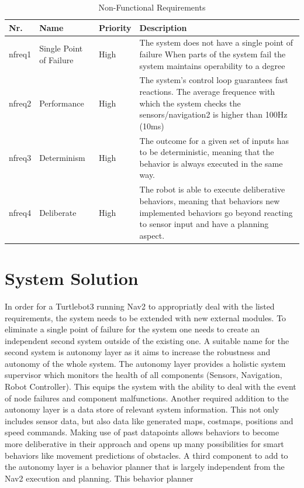 \begin{table}[h!]
\caption{Non-Functional Requirements}
	\begin{tabular}{ | m{} | m{}| m{} | m{} |} 
  	\hline
  	Nr. & Name & Priority & Description \\ 
  	\hline
  	nfreq1 & Single Point of Failure & High &  The system does not have a single point of failure	When parts of the system fail the system maintains operability to a degree \\ 
  	\hline
  	nfreq2 & Performance & High & The system's control loop guarantees fast reactions. The average frequence with which the system checks the sensors/navigation2 is higher than 100Hz (10ms) \\ 
  	\hline
  	nfreq3 & Determinism & High & The outcome for a given set of inputs has to be deterministic, meaning that the behavior is always executed in the same way. \\
  	\hline
  	nfreq4 & Deliberate & High & The robot is able to execute deliberative behaviors, meaning that behaviors new implemented behaviors go beyond reacting to sensor input and have a planning aspect. \\
	\end{tabular}
\end{table}

\section{System Solution}

In order for a Turtlebot3 running Nav2 to appropriatly deal with the listed requirements, the system needs to be extended with new external modules. To eliminate a single point of failure for the system one needs to create an independent second system outside of the existing one. A suitable name for the second system is autonomy layer as it aims to increase the robustness and autonomy of the whole system. 
The autonomy layer provides a holistic system supervisor which monitors the health of all components (Sensors, Navigation, Robot Controller). This equips the system with the ability to deal with the event of node failures and component malfunctions. 
Another required addition to the autonomy layer is a data store of relevant system information. This not only includes sensor data, but also data like generated maps, costmaps, positions and speed commands. Making use of past datapoints allows behaviors to become more deliberative in their approach and opens up many possibilities for smart behaviors like movement predictions of obstacles. 
A third component to add to the autonomy layer is a behavior planner that is largely independent from the Nav2 execution and planning. This behavior planner 


